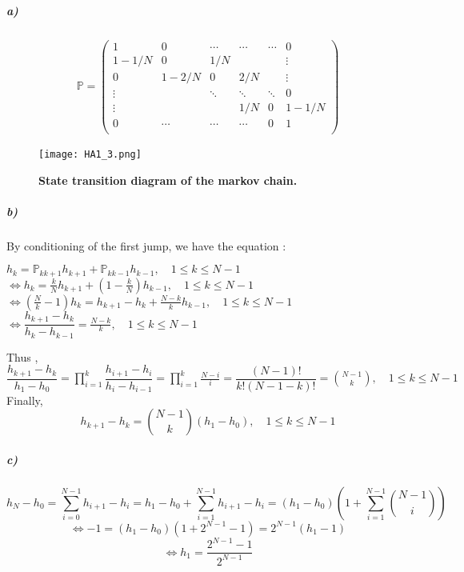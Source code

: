 \documentclass{article}
\begin{document}
\subparagraph{a)}

\begin{align*}
\mathbb{P}=
\begin{pmatrix}
1 & 0 & \cdots & \cdots & \cdots & 0 \\
1-1/N & 0 & 1/N &  &   & \vdots \\
0 & 1-2/N & 0 & 2/N &  & \vdots \\
\vdots &  & \ddots & \ddots & \ddots & 0 \\
\vdots &  &  & 1/N & 0 & 1-1/N \\
0 & \cdots & \cdots & \cdots & 0 & 1 \\
\end{pmatrix}
\end{align*}

\begin{figure}[H]
	  \centering
  	\texttt{[image: HA1\_3.png]}
  	\caption{\textbf{State transition diagram of the markov chain.}}
	\end{figure}

\subparagraph{b)}
By conditioning of the first jump, we have the equation : 
\begin{center}
$h_k=\mathbb{P}_{k k+1}h_{k+1}+\mathbb{P}_{k k-1}h_{k-1}, \quad 1 \leq k \leq N-1 $ \\
$\iff h_k=\frac{k}{N} h_{k+1}+(1-\frac{k}{N}) h_{k-1}, \quad 1 \leq k \leq N-1 $\\
$\iff (\frac{N}{k}-1)h_k=h_{k+1} - h_k +\frac{N-k}{k} h_{k-1}, \quad 1 \leq k \leq N-1 $\\
$\iff \dfrac{h_{k+1}-h_k}{h_{k} - h_{k-1}}=\frac{N-k}{k}, \quad 1 \leq k \leq N-1 $
\end{center}
Thus , $ \displaystyle \dfrac{h_{k+1}-h_k}{h_{1} - h_{0}}=\prod_{i=1}^k \dfrac{h_{i+1}-h_i}{h_{i} - h_{i-1}}=\prod_{i=1}^k \frac{N-i}{i}=\dfrac{(N-1)!}{k!(N-1-k)!}=\binom{N-1}{k}, \quad 1 \leq k \leq N-1 $\\
Finally, $$ \displaystyle h_{k+1}-h_k=\binom{N-1}{k}(h_{1} - h_{0}), \quad 1 \leq k \leq N-1 $$

\subparagraph{c)}
 $$ \displaystyle h_{N}-h_0=\sum_{i=0}^{N-1} h_{i+1}-h_i=h_{1} - h_{0} + \sum_{i=1}^{N-1} h_{i+1}-h_i=(h_{1} - h_{0})\left(1 + \sum_{i=1}^{N-1}\binom{N-1}{i}\right)$$
 $$ \iff -1=(h_{1} - h_{0})(1 + 2^{N-1} -1)=2^{N-1}(h_1-1)$$
 $$ \iff h_1= \dfrac{2^{N-1}-1}{2^{N-1}} $$
\end{document}
